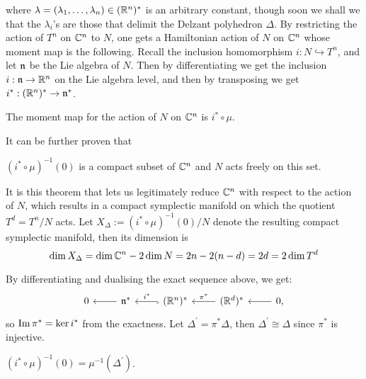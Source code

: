 where $\lambda = (\lambda_{1},\ldots, \lambda_{n}) \in (\mathbb{R}^{n})^{\ast}$ is an arbitrary constant, though soon we shall we that the $\lambda_{i}$'s are those that delimit the Delzant polyhedron $\Delta$. By restricting the action of $T^{n}$ on $\mathbb{C}^{n}$ to $N$, one gets a Hamiltonian action of $N$ on $\mathbb{C}^{n}$ whose moment map is the following. Recall the inclusion homomorphism $i:N \hookrightarrow T^{n}$, and let $\mathfrak{n}$ be the Lie algebra of $N$. Then by differentiating we get the inclusion $i:\mathfrak{n} \rightarrow \mathbb{R}^{n}$ on the Lie algebra level, and then by transposing we get $i^{\ast}: (\mathbb{R}^{n})^{\ast} \rightarrow \mathfrak{n}^{\ast}$.
\begin{lem}
	The moment map for the action of $N$ on $\mathbb{C}^{n}$ is $i^{\ast} \circ \mu$.
\end{lem}
It can be further proven that
\begin{thm}
	$(i^{\ast} \circ \mu)^{-1}(0)$ is a compact subset of $\mathbb{C}^{n}$ and $N$ acts freely on this set.
\end{thm}

It is this theorem that lets us legitimately reduce $\mathbb{C}^{n}$ with respect to the action of $N$, which results in a compact symplectic manifold on which the quotient $T^{d} = T^{n}/N$ acts. Let $X_{\Delta} := (i^{\ast} \circ \mu)^{-1}(0)/N$ denote the resulting compact symplectic manifold, then its dimension is
\begin{equation*}
	\dim X_{\Delta} = \dim \mathbb{C}^{n} - 2 \dim N = 2n - 2(n - d) = 2d = 2\dim T^{d}
\end{equation*}

\begin{rmk}
	By differentiating and dualising the exact sequence above, we get:
	\[
	\begin{tikzcd}
	0  & \arrow[l]  \mf{n}^{\ast} & \arrow[l, hook, "i^{\ast}", swap] (\RR^{n})^{\ast} & \arrow[l, "\pi^{\ast}", swap] (\RR^{d})^{\ast} & \arrow[l] 0,
	\end{tikzcd}
	\]
	so $\operatorname{Im}\pi^{\ast} = \ker i^{\ast}$ from the exactness. Let $\Delta^{\prime} = \pi^{\ast}\Delta$, then $\Delta^{\prime} \cong \Delta$ since $\pi^{\ast}$ is injective. 
\end{rmk}

\begin{lem}
	$(i^{\ast} \circ \mu)^{-1}(0) = \mu^{-1}(\Delta^{\prime})$.
\end{lem}

